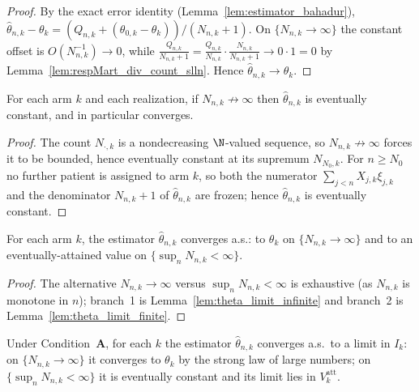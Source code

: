 \begin{proof}\leanok
{}
By the exact error identity (Lemma~\ref{lem:estimator_bahadur}),
$\hat\theta_{n,k}-\theta_k = (Q_{n,k}+(\theta_{0,k}-\theta_k))/(N_{n,k}+1)$. On
$\{N_{n,k}\to\infty\}$ the constant offset is $O(N_{n,k}^{-1})\to0$, while
$\frac{Q_{n,k}}{N_{n,k}+1} = \frac{Q_{n,k}}{N_{n,k}}\cdot\frac{N_{n,k}}{N_{n,k}+1}\to0\cdot1=0$
by Lemma~\ref{lem:respMart_div_count_slln}. Hence $\hat\theta_{n,k}\to\theta_k$.
\end{proof}

\begin{lemma}\label{lem:theta_limit_finite}
\leanok
{}
For each arm $k$ and each realization, if $N_{n,k}\not\to\infty$ then $\hat\theta_{n,k}$ is
eventually constant, and in particular converges.
\end{lemma}

\begin{proof}\leanok
The count $N_{\cdot,k}$ is a nondecreasing $\N$-valued sequence, so $N_{n,k}\not\to\infty$
forces it to be bounded, hence eventually constant at its supremum $N_{N_0,k}$. For $n\ge N_0$
no further patient is assigned to arm $k$, so both the numerator $\sum_{j<n}X_{j,k}\xi_{j,k}$
and the denominator $N_{n,k}+1$ of $\hat\theta_{n,k}$ are frozen; hence $\hat\theta_{n,k}$ is
eventually constant.
\end{proof}

\begin{lemma}\label{lem:theta_converges}
\leanok
{}
For each arm $k$, the estimator $\hat\theta_{n,k}$ converges a.s.: to $\theta_k$ on
$\{N_{n,k}\to\infty\}$ and to an eventually-attained value on $\{\sup_n N_{n,k}<\infty\}$.
\end{lemma}

\begin{proof}\leanok
{}
The alternative $N_{n,k}\to\infty$ versus $\sup_n N_{n,k}<\infty$ is exhaustive (as $N_{n,k}$
is monotone in $n$); branch~1 is Lemma~\ref{lem:theta_limit_infinite} and branch~2 is
Lemma~\ref{lem:theta_limit_finite}.
\end{proof}

\begin{lemma}\label{lem:theta_limit_dichotomy}
\leanok
{}
Under Condition~\textbf{A}, for each $k$ the estimator $\hat{\theta}_{n,k}$
converges a.s.\ to a limit in $I_k$: on $\{N_{n,k}\to\infty\}$ it converges to
$\theta_k$ by the strong law of large numbers; on $\{\sup_n N_{n,k} < \infty\}$
it is eventually constant and its limit lies in $V_k^{\mathrm{att}}$.
\end{lemma}

